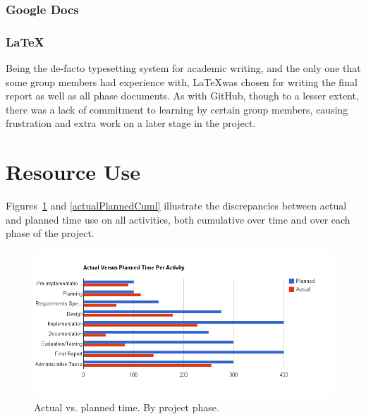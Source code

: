 \subsubsection{Google Docs}


\subsubsection{\LaTeX}
Being the de-facto typesetting system for academic writing, and the
only one that some group members had experience with, \LaTeX was
chosen for writing the final report as well as all phase documents. As
with GitHub, though to a lesser extent,  there was a lack of commitment to learning by certain
group members, causing frustration and extra work on a later stage
in the project.


\section{Resource Use}

Figures~\ref{perActivity} and \ref{actualPlannedCuml} illustrate
the discrepancies between actual and planned time use on all
activities, both cumulative over time and over each phase of the project.

\begin{centering}
  \begin{figure}
    \includegraphics[width = \textwidth]{Evaluation/time_per_activity.png}
    \caption{Actual vs. planned time. By project phase.}
    \label{perActivity}
  \end{figure}
\end{centering}

